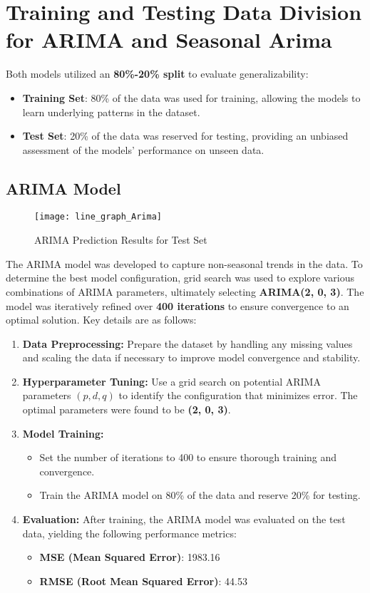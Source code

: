 \section*{Training and Testing Data Division for ARIMA and Seasonal Arima}
Both models utilized an \textbf{80\%-20\% split} to evaluate generalizability:
\begin{itemize}
	\item \textbf{Training Set}: 80\% of the data was used for training, allowing the models to learn underlying patterns in the dataset.
	\item \textbf{Test Set}: 20\% of the data was reserved for testing, providing an unbiased assessment of the models' performance on unseen data.
\end{itemize}
\subsection{ARIMA Model}

\begin{figure}[H]
	\centering
	\texttt{[image: line\_graph\_Arima]}
	\caption{ARIMA Prediction Results for Test Set}
	\label{fig:Arima_result}
\end{figure}

The ARIMA model was developed to capture non-seasonal trends in the data. To determine the best model configuration, grid search was used to explore various combinations of ARIMA parameters, ultimately selecting \textbf{ARIMA(2, 0, 3)}. The model was iteratively refined over \textbf{400 iterations} to ensure convergence to an optimal solution. Key details are as follows:

\begin{enumerate}
	\item \textbf{Data Preprocessing:}  
	Prepare the dataset by handling any missing values and scaling the data if necessary to improve model convergence and stability.
	
	\item \textbf{Hyperparameter Tuning:}  
	Use a grid search on potential ARIMA parameters $(p, d, q)$ to identify the configuration that minimizes error. The optimal parameters were found to be \textbf{(2, 0, 3)}.
	
	\item \textbf{Model Training:}
	\begin{itemize}
		\item Set the number of iterations to 400 to ensure thorough training and convergence.
		\item Train the ARIMA model on 80\% of the data and reserve 20\% for testing.
	\end{itemize}
	
	\item \textbf{Evaluation:}  
	After training, the ARIMA model was evaluated on the test data, yielding the following performance metrics:
	\begin{itemize}
		\item \textbf{MSE (Mean Squared Error)}: 1983.16
		\item \textbf{RMSE (Root Mean Squared Error)}: 44.53
	\end{itemize}
\end{enumerate}


